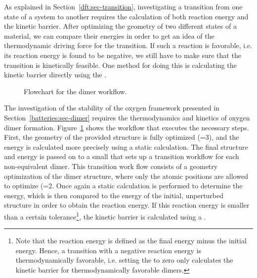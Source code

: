 \begin{refsection}
 
As explained in Section~\ref{dft:sec-transition}, investigating a transition 
from one state of a system to another requires the calculation of both 
reaction energy and the kinetic barrier. After optimizing the geometry of two 
different states of a material, we can compare their energies in order to get 
an idea of the thermodynamic driving force for the transition. If such a 
reaction is favorable, i.e. its reaction energy is found to be negative, we 
still have to make sure that the transition is kinetically feasible. One 
method for doing this is calculating the kinetic barrier directly using the 
. 
 
\begin{figure}[ht!] 
\centering 
 
\caption{\label{automation:fig-dimer} Flowchart for the dimer workflow.} 
\end{figure} 
 
The investigation of the stability of the oxygen framework presented in 
Section~\ref{batteries:sec-dimer} requires the thermodynamics and kinetics of 
oxygen dimer formation. Figure~\ref{automation:fig-dimer} shows the workflow 
that executes the necessary steps. First, the geometry of the provided 
structure is fully optimized (=3), and the energy is calculated 
more precisely using a static calculation. The final structure and energy is 
passed on to a small  that sets up a transition workflow
for each non-equivalent dimer. This transition work flow consists of a 
geometry optimization of the dimer structure, where only the atomic positions 
are allowed to optimize (=2. Once again a static calculation is 
performed to determine the energy, which is then compared to the energy of the 
initial, unperturbed structure in order to obtain the reaction energy. If this 
reaction energy is smaller than a certain tolerance\footnote{Note that the reaction energy is defined as the final energy minus the initial energy. Hence, a transition with a negative reaction energy is thermodynamically favorable, i.e. setting the  to zero only calculates the kinetic barrier for thermodynamically favorable dimers.}, the kinetic barrier is 
calculated using a . 


\end{refsection}
